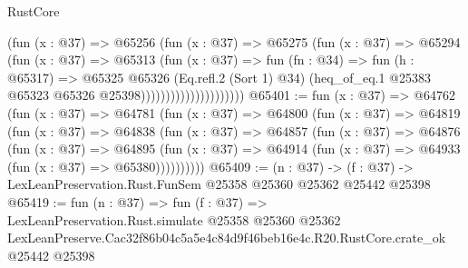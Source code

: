 \begin{lexlean}{RustCore}
\begin{coremodule}
                                  (fun (x : @37) =>
                                  @65256
                                    (fun (x : @37) =>
                                    @65275
                                      (fun (x : @37) =>
                                      @65294
                                        (fun (x : @37) =>
                                        @65313
                                          (fun (x : @37) =>
                                          fun (fn : @34) =>
                                          fun (h : @65317) =>
                                          @65325
                                            @65326
                                            (Eq.refl.{2} (Sort 1) @34)
                                            (heq_of_eq.{1}
                                              @25383
                                              @65323
                                              @65326
                                              @25398)))))))))))))))))))))
@65401 := fun (x : @37) =>
  @64762
    (fun (x : @37) =>
    @64781
      (fun (x : @37) =>
      @64800
        (fun (x : @37) =>
        @64819
          (fun (x : @37) =>
          @64838
            (fun (x : @37) =>
            @64857
              (fun (x : @37) =>
              @64876
                (fun (x : @37) =>
                @64895
                  (fun (x : @37) =>
                  @64914 (fun (x : @37) => @64933 (fun (x : @37) => @65380))))))))))
@65409 := (n : @37) ->
  (f : @37) -> LexLeanPreservation.Rust.FunSem @25358 @25360 @25362 @25442 @25398
@65419 := fun (n : @37) =>
  fun (f : @37) =>
  LexLeanPreservation.Rust.simulate
    @25358
    @25360
    @25362
    LexLeanPreserve.Cac32f86b04c5a5e4c84d9f46beb16e4c.R20.RustCore.crate_ok
    @25442
    @25398
\end{coremodule}
\end{lexlean}
